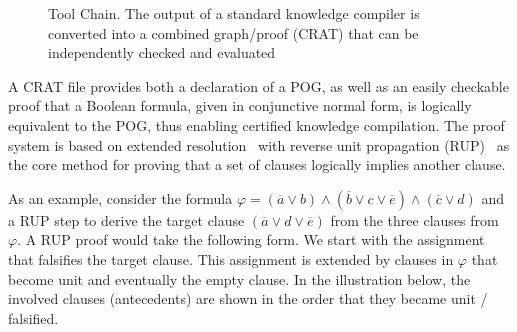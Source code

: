 \documentclass[letterpaper,USenglish,cleveref, autoref, thm-restate]{lipics-v2021}
\newcommand{\obar}[1]{\overline{#1}}
\begin{document}
\begin{figure}
\caption{Tool Chain. The output of a standard knowledge compiler is converted into a combined graph/proof (CRAT) that can be independently checked and evaluated}
\label{fig:chain}
\end{figure}

A CRAT file provides both a declaration of a POG, as well as an easily checkable
proof that a Boolean formula, given in conjunctive normal
form, is logically equivalent to the POG, thus enabling certified
knowledge compilation.  The proof system is based on extended
resolution~\cite{Tseitin:1983} with reverse unit propagation
(RUP)~\cite{goldberg,vangelder08_verifying_rup_proofs} as the core method for
proving that a set of clauses logically implies another clause.

As an example, consider the formula $\varphi = (\obar{a} \lor b) \land (\obar{b} \lor c \lor \obar{e}) \land (\obar c \lor d)$ 
and a RUP step to derive the target clause $(\obar{a} \lor d \lor \obar{e})$ from the three clauses from $\varphi$.
A RUP proof would take the following form.  We start with the assignment that falsifies the target clause. This assignment
is extended by clauses in $\varphi$ that become unit and eventually the empty clause. In the illustration below, the 
involved clauses (antecedents) are shown in the order that they became unit / falsified. 
\end{document}
